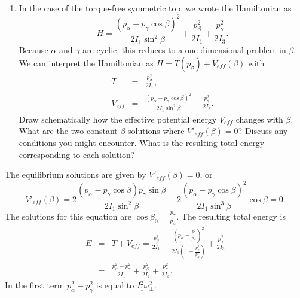 \documentclass[letterpaper,11pt]{article}
\begin{document}
\begin{enumerate}[resume]
 \item In the case of the torque-free symmetric top, we wrote the Hamiltonian as
 \begin{equation*}
  H = \frac{(p_\alpha - p_\gamma\cos\beta)^2}{2 I_1 \sin^2\beta} + \frac{p^2_\beta}{2 I_1} + \frac{p^2_\gamma}{2 I_3}.
 \end{equation*}
 Because $\alpha$ and $\gamma$ are cyclic, this reduces to a one-dimensional problem in $\beta$.  We can interpret the Hamiltonian as $H = T(p_\beta) + V_{eff}(\beta)$ with
 \begin{eqnarray*}
  T & = & \frac{p^2_\beta}{2 I_1}, \\
  V_{eff} & = & \frac{(p_\alpha - p_\gamma\cos\beta)^2}{2 I_1 \sin^2\beta} + \frac{p^2_\gamma}{2 I_3}.
 \end{eqnarray*}
 Draw schematically how the effective potential energy $V_{eff}$ changes with $\beta$.  What are the two constant-$\beta$ solutions where $V'_{eff}(\beta) = 0$?  Discuss any conditions you might encounter.  What is the resulting total energy corresponding to each solution?
\end{enumerate}
The equilibrium solutions are given by $V'_{eff}(\beta) = 0$, or
\begin{equation*}
 V'_{eff}(\beta) = 2 \frac{(p_\alpha - p_\gamma \cos\beta) p_\gamma \sin\beta}{2 I_1 \sin^2 \beta} - 2 \frac{(p_\alpha - p_\gamma \cos\beta)^2}{2 I_1 \sin^3 \beta} \cos\beta = 0.
\end{equation*}
The solutions for this equation are $\cos\beta_0 = \frac{p_\gamma}{p_\alpha}$.  The resulting total energy is
\begin{eqnarray*}
 E & = & T + V_{eff} = \frac{p_\beta^2}{2 I_1} + \frac{\left(p_\alpha - \frac{p_\gamma^2}{p_\alpha}\right)^2}{2 I_1 \left(1 - \frac{p_\gamma^2}{p_\alpha^2}\right)} + \frac{p_\gamma^2}{2 I_3} \\
 & = & \frac{p_\alpha^2 - p_\gamma^2}{2 I_1} + \frac{p_\beta^2}{2 I_1} + \frac{p_\gamma^2}{2 I_3}.
\end{eqnarray*}
In the first term $p_\alpha^2 - p_\gamma^2$ is equal to $I_1^2 \omega_\perp^2$.
\end{document}
